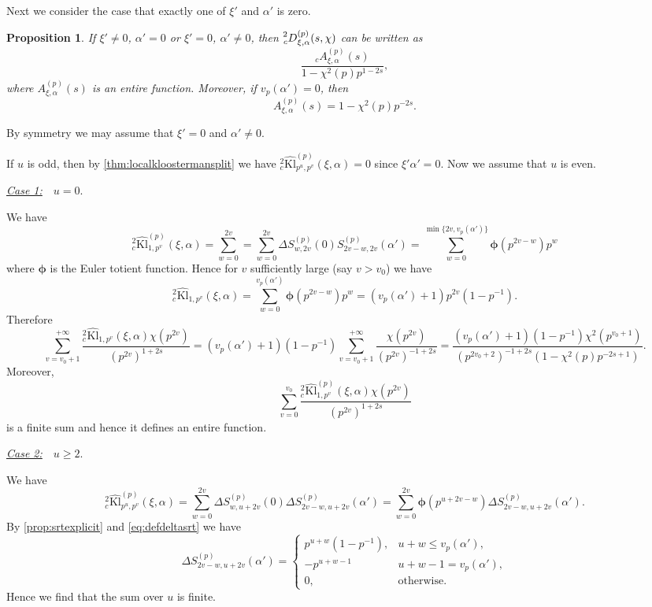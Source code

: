 \documentclass[10pt,oneside,reqno]{amsart}
\makeatletter
\newcommand\Kl{\mathrm{Kl}}
\renewcommand\leq{\leqslant}
\renewcommand\geq{\geqslant}
\theoremstyle{THEOREM}
\newtheorem{proposition}[theorem]{Proposition}
\theoremstyle{DEFINITION}
\theoremstyle{EXERCISE}
\numberwithin{equation}{section}
\renewenvironment{proof}[1][\proofname]{\par
  \vspace{-6pt}
  \pushQED{\qed}
  \normalfont \topsep6\p@\@plus6\p@\relax
  \trivlist
  \item[\hskip\labelsep\rmfamily\bfseries
    #1\@addpunct{:}]\ignorespaces
}{
  \popQED\endtrivlist\@endpefalse
  \vspace{-6pt}
}
\makeatother
\begin{document}
Next we consider the case that exactly one of $\xi'$ and $\alpha'$ is zero.
\begin{proposition}\label{prop:onezerosplit}
If $\xi'\neq 0$, $\alpha'=0$ or $\xi'=0$, $\alpha'\neq 0$, then $\prescript{2}{c}D_{\xi,\alpha}^{(p)}(s,\chi)$ can be written as
\[
\frac{_cA^{(p)}_{\xi,\alpha}(s)}{1-\chi^2(p)p^{1-2s}},
\]
where $A^{(p)}_{\xi,\alpha}(s)$ is an entire function. Moreover, if $v_p(\alpha')=0$, then 
\[
A_{\xi,\alpha}^{(p)}(s)=1-\chi^2(p)p^{-2s}.
\]
\end{proposition}
\begin{proof}
By symmetry we may assume that $\xi'=0$ and $\alpha'\neq 0$.
 
If $u$ is odd, then by \autoref{thm:localkloostermansplit} we have ${}_c^2\widehat{\Kl}_{p^u,p^v}^{(p)}(\xi,\alpha)=0$ since $\xi'\alpha'=0$. Now we assume that $u$ is even.

\underline{\emph{Case 1:}}\ \ $u=0$. 

We have
\begin{equation}\label{eq:kloostermanuzero}
{}_c^2\widehat{\Kl}_{1,p^v}^{(p)}(\xi,\alpha)=\sum_{w=0}^{2v}=\sum_{w=0}^{2v}\Delta S_{w,2v}^{(p)}(0)S_{2v-w,2v}^{(p)}(\alpha')=\sum_{w=0}^{\min\{2v,v_p(\alpha')\}}\bm\phi(p^{2v-w})p^w
\end{equation}
where $\bm \phi$ is the Euler totient function. Hence for $v$ sufficiently large (say $v>v_0$) we have
\[
{}_c^2\widehat{\Kl}_{1,p^v}(\xi,\alpha)=\sum_{w=0}^{v_p(\alpha')}\bm \phi(p^{2v-w})p^w =(v_p(\alpha')+1)p^{2v}(1-p^{-1}).
\]
Therefore
\[
\sum_{v=v_0+1}^{+\infty}\frac{{}_c^2\widehat{\Kl}_{1,p^v}(\xi,\alpha) \chi(p^{2v})}{(p^{2v})^ {1+2s}}=(v_p(\alpha')+1)(1-p^{-1})\sum_{v=v_0+1}^{+\infty}\frac{\chi(p^{2v})}{(p^{2v})^{-1+2s}}= \frac{(v_p(\alpha')+1)(1-p^{-1})\chi^2(p^{v_0+1})}{(p^{2v_0+2})^{-1+2s}(1-\chi^2(p)p^{-2s+1})}.
\]
Moreover,
\[
\sum_{v=0}^{v_0}\frac{{}_c^2\widehat{\Kl}^{(p)}_{1,p^v}(\xi,\alpha)\chi(p^{2v})}{(p^{2v})^ {1+2s}}
\]
is a finite sum and hence it defines an entire function.

\underline{\emph{Case 2:}}\ \ $u\geq 2$. 

We have
\[
{}_c^2\widehat{\Kl}_{p^u,p^v}^{(p)}(\xi,\alpha)=\sum_{w=0}^{2v}\Delta S_{w,u+2v}^{(p)}(0)\Delta S_{2v-w,u+2v}^{(p)}(\alpha')=\sum_{w=0}^{2v}\bm\phi(p^{u+2v-w})\Delta S_{2v-w,u+2v}^{(p)}(\alpha').
\]
By \autoref{prop:srtexplicit} and \eqref{eq:defdeltasrt} we have
\[
\Delta S_{2v-w,u+2v}^{(p)}(\alpha')=\begin{cases}
                                         p^{u+w}(1-p^{-1}), & u+w\leq v_p(\alpha') , \\
                                        -p^{u+w-1} & u+w-1=v_p(\alpha') ,\\
                                         0, & \text{otherwise}.
                                       \end{cases}
\]
Hence we find that the sum over $u$ is finite. 


\end{proof}
\end{document}
